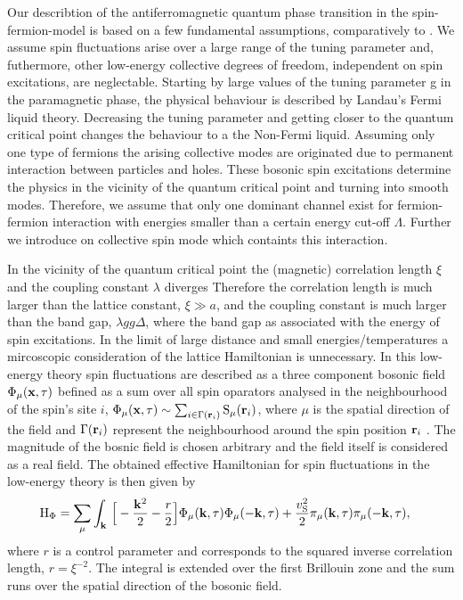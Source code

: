 Our describtion of the antiferromagnetic quantum phase transition in the spin-fermion-model is based on a few fundamental assumptions, comparatively to \cite{Abanov&Chubukov&Schmalian}.
We assume spin fluctuations arise over a large range of the tuning parameter and, futhermore, other low-energy collective degrees of freedom, independent on spin excitations, are neglectable.
Starting by large values of the tuning parameter g in the paramagnetic phase, the physical behaviour is described by Landau's Fermi liquid theory.
Decreasing the tuning parameter and getting closer to the quantum critical point changes the behaviour to a the Non-Fermi liquid.
Assuming only one type of fermions the arising collective modes are originated due to permanent interaction between particles and holes.
These bosonic spin excitations determine the physics in the vicinity of the quantum critical point and turning into smooth modes.
Therefore, we assume that only one dominant channel exist for fermion-fermion interaction with energies smaller than a certain energy cut-off $\Lambda$.
Further we introduce on collective spin mode which containts this interaction.

In the vicinity of the quantum critical point the (magnetic) correlation length $\xi$ and the coupling constant $\lambda$ diverges
Therefore the correlation length is much larger than the lattice constant, $\xi \gg a$, and the coupling constant is much larger than the band gap, $\lambda gg \Delta$, where the band gap as associated with the energy of spin excitations.
In the limit of large distance and small energies/temperatures a mircoscopic consideration of the lattice Hamiltonian is unnecessary.
In this low-energy theory spin fluctuations are described as a three component bosonic field $\Phi_{\mu}(\vb{x}, \tau)$ befined as a sum over all spin oparators analysed in the neighbourhood of the spin's site $i$, $\Phi_{\mu}(\vb{x}, \tau) \sim \sum_{i \in \Gamma(\vb{r}_{i})} \mathrm{S}_{\mu}(\vb{r}_{i})$, where $\mu$ is the spatial direction of the field and $\Gamma(\vb{r}_{i})$ represent the neighbourhood around the spin position $\vb{r}_{i}$ \cite{SachdevQCP}.
The magnitude of the bosnic field is chosen arbitrary and the field itself is considered as a real field.
The obtained effective Hamiltonian for spin fluctuations in the low-energy theory is then given by
%
\begin{align}
	\mathrm{H}_{\Phi} &= 
	 	\sum\limits_{\mu} \int_{\vb{k}}\, \Big[
	 	-\frac{\vb{k}^{2}}{2} - \frac{r}{2}\Big] \Phi_{\mu}(\vb{k},\tau) \Phi_{\mu}(-\vb{k},\tau)
		+
		\frac{v_{\mathrm{S}}^{2}}{2} \pi_{\mu}(\vb{k},\tau) \pi_{\mu}(-\vb{k},\tau),
	\label{eq:Hamiltonian spin fluctuation}
\end{align}
%
where $r$ is a control parameter and corresponds to the squared inverse correlation length, $r = \xi^{-2}$.
The integral is extended over the first Brillouin zone and the sum runs over the spatial direction of the bosonic field.

